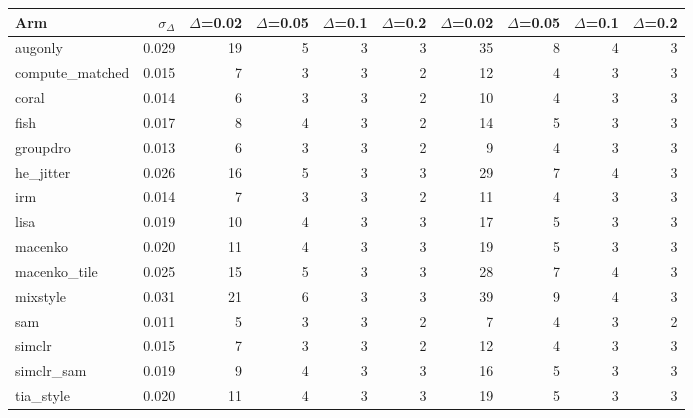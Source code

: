 \begin{tabular}{lrrrrrrrrr}
\toprule
Arm & $\sigma_\Delta$ & $\Delta$=0.02 & $\Delta$=0.05 & $\Delta$=0.1 & $\Delta$=0.2 & $\Delta$=0.02 & $\Delta$=0.05 & $\Delta$=0.1 & $\Delta$=0.2 \\
\midrule
augonly & 0.029 & 19 & 5 & 3 & 3 & 35 & 8 & 4 & 3 \\
compute\_matched & 0.015 & 7 & 3 & 3 & 2 & 12 & 4 & 3 & 3 \\
coral & 0.014 & 6 & 3 & 3 & 2 & 10 & 4 & 3 & 3 \\
fish & 0.017 & 8 & 4 & 3 & 2 & 14 & 5 & 3 & 3 \\
groupdro & 0.013 & 6 & 3 & 3 & 2 & 9 & 4 & 3 & 3 \\
he\_jitter & 0.026 & 16 & 5 & 3 & 3 & 29 & 7 & 4 & 3 \\
irm & 0.014 & 7 & 3 & 3 & 2 & 11 & 4 & 3 & 3 \\
lisa & 0.019 & 10 & 4 & 3 & 3 & 17 & 5 & 3 & 3 \\
macenko & 0.020 & 11 & 4 & 3 & 3 & 19 & 5 & 3 & 3 \\
macenko\_tile & 0.025 & 15 & 5 & 3 & 3 & 28 & 7 & 4 & 3 \\
mixstyle & 0.031 & 21 & 6 & 3 & 3 & 39 & 9 & 4 & 3 \\
sam & 0.011 & 5 & 3 & 3 & 2 & 7 & 4 & 3 & 2 \\
simclr & 0.015 & 7 & 3 & 3 & 2 & 12 & 4 & 3 & 3 \\
simclr\_sam & 0.019 & 9 & 4 & 3 & 3 & 16 & 5 & 3 & 3 \\
tia\_style & 0.020 & 11 & 4 & 3 & 3 & 19 & 5 & 3 & 3 \\
\bottomrule
\end{tabular}
